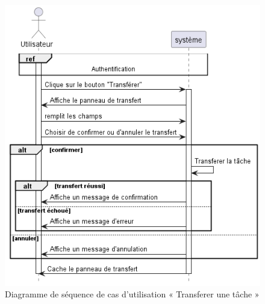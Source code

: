 \begin{figure}[H]
  \centering
  \includegraphics[width=1\textwidth]{out/diagrams/documents/transfer_task/transfer_task}
  \caption{Diagramme de séquence de cas d'utilisation « Transferer une tâche  »}
  \label{fig:sequence_transfer_task}
\end{figure}
